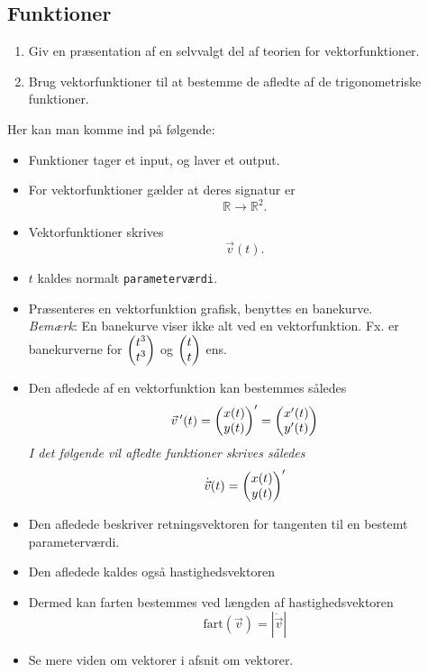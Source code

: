 \documentclass{article}
\begin{document}
\begin{tcolorbox}
    \section{Funktioner}
    \tcblower
    \begin{enumerate}
        \item Giv en præsentation af en selvvalgt del af teorien for vektorfunktioner.
        \item Brug vektorfunktioner til at bestemme de afledte af de trigonometriske funktioner.
    \end{enumerate}
\end{tcolorbox}
Her kan man komme ind på følgende:
\begin{itemize}
    \item Funktioner tager et input, og laver et output.
    \item For vektorfunktioner gælder at deres signatur er
        \[
            \mathbb{R} \rightarrow \mathbb{R}^2.
        \] 
    \item Vektorfunktioner skrives
        \[
            \vec{v}(t).
        \] 
    \item $t$ kaldes normalt \texttt{parameterværdi}.
    \item Præsenteres en vektorfunktion grafisk, benyttes en banekurve.\\
        \textit{Bemærk}: En banekurve viser ikke alt ved en vektorfunktion. Fx.
        er banekurverne for $ \begin{pmatrix} t^3\\ t^3 \end{pmatrix} $ og $ \begin{pmatrix} t\\ t \end{pmatrix} $ ens.
    \item Den afledede af en vektorfunktion kan bestemmes således
        \[
            \vec{v}\,'(t) =  \begin{pmatrix} x(t)\\ y(t) \end{pmatrix} ' =  \begin{pmatrix} x'(t)\\ y'(t) \end{pmatrix} 
        \] 
        \textit{I det følgende vil afledte funktioner skrives således}
        \[
            \dot{\vec{v}}(t) = { \begin{pmatrix} x(t)\\ y(t) \end{pmatrix} }'
        \] 
    \item Den afledede beskriver retningsvektoren for tangenten til en bestemt
        parameterværdi.

    \item Den afledede kaldes også hastighedsvektoren
    \item Dermed kan farten bestemmes ved længden af hastighedsvektoren
        \[
            \text{fart}(\vec{v}) = \left|\dot{\vec{v}}\right|
        \] 
    \item Se mere viden om vektorer i afsnit om vektorer.
\end{itemize}
\end{document}

